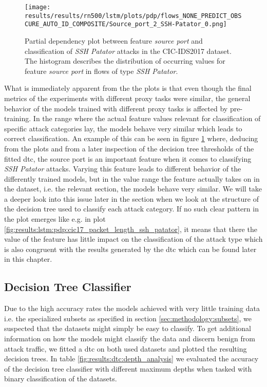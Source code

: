 \begin{figure}[h]
	\centering
	\texttt{[image: results/results/rn500/lstm/plots/pdp/flows\_NONE\_PREDICT\_OBSCURE\_AUTO\_ID\_COMPOSITE/Source\_port\_2\_SSH-Patator\_0.png]}
	\caption{Partial dependency plot between feature \textit{source port} and classification of \textit{SSH Patator} attacks in the CIC-IDS2017 dataset. The histogram describes the distribution of occurring values for feature \textit{source port} in flows of type \textit{SSH Patator}.}
	\label{fig:results:lstm:pdp:cic17_source_port_ssh_patator}
\end{figure}


What is immediately apparent from the the plots is that even though the final metrics of the experiments with different proxy tasks were similar, the general behavior of the models trained with different proxy tasks is affected by pre-training. In the range where the actual feature values relevant for classification of specific attack categories lay, the models behave very similar which leads to correct classification. An example of this can be seen in figure \ref{fig:results:lstm:pdp:cic17_source_port_ssh_patator} where, deducing from the plots and from a later inspection of the decision tree thresholds of the fitted \gls{dtc}, the source port is an important feature when it comes to classifying \textit{SSH Patator} attacks. Varying this feature leads to different behavior of the differently trained models, but in the value range the feature actually takes on in the dataset, i.e. the relevant section, the models behave very similar. We will take a deeper look into this issue later in the section when we look at the structure of the decision tree used to classify each attack category. If no such clear pattern in the plot emerges like e.g. in plot \ref{fig:results:lstm:pdp:cic17_packet_length_ssh_patator}, it means that there the value of the feature has little impact on the classification of the attack type which is also congruent with the results generated by the \gls{dtc} which can be found later in this chapter.

\FloatBarrier

\subsection{Decision Tree Classifier} \label{sec:results:explainability:dtc}

Due to the high accuracy rates the models achieved with very little training data i.e. the specialized subsets as specified in section \ref{sec:methodology:subsets}, we suspected that the datasets might simply be easy to classify. To get additional information on how the models might classify the data and discern benign from attack traffic, we fitted a \gls{dtc} on both used datasets and plotted the resulting decision trees. In table \ref{fig:results:dtc:depth_analysis} we evaluated the accuracy of the decision tree classifier with different maximum depths when tasked with binary classification of the datasets. 

